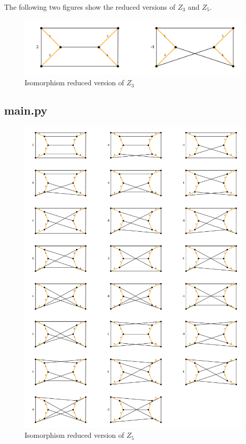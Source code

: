 The following two figures show the reduced versions of $Z_3$ and $Z_5$.

\begin{figure}[h]
	\centering
	\includegraphics[width=\textwidth]{./ForestedGraphs/MCCycle3.pdf}
	\caption{Isomorphism reduced version of $Z_3$}
\end{figure}
\subsection{main.py}

\begin{figure}[p]
	\centering
	\includegraphics[width=\textwidth]{./ForestedGraphs/MCCycle5.pdf}
	\caption{Isomorphism reduced version of $Z_5$}
\end{figure}

